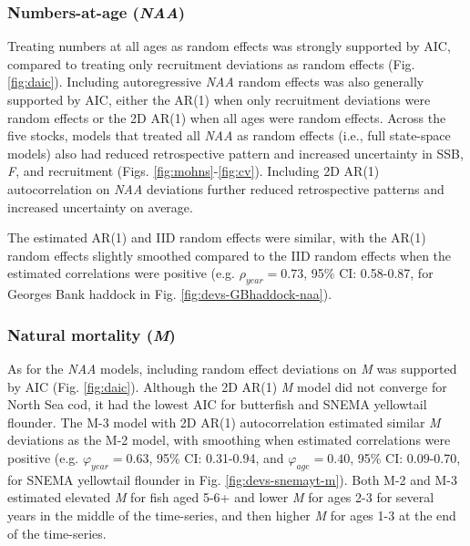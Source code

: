 \documentclass[]{article}
\begin{document}
\hypertarget{numbers-at-age-naa-1}{%
\subsubsection{\texorpdfstring{Numbers-at-age
(\emph{NAA})}{Numbers-at-age (NAA)}}\label{numbers-at-age-naa-1}}

Treating numbers at all ages as random effects was strongly supported by
AIC, compared to treating only recruitment deviations as random effects
(Fig. \ref{fig:daic}). Including autoregressive \emph{NAA} random
effects was also generally supported by AIC, either the AR(1) when only
recruitment deviations were random effects or the 2D AR(1) when all ages
were random effects. Across the five stocks, models that treated all
\emph{NAA} as random effects (i.e., full state-space models) also had
reduced retrospective pattern and increased uncertainty in SSB,
\emph{F}, and recruitment (Figs. \ref{fig:mohns}-\ref{fig:cv}).
Including 2D AR(1) autocorrelation on \emph{NAA} deviations further
reduced retrospective patterns and increased uncertainty on average.

The estimated AR(1) and IID random effects were similar, with the AR(1)
random effects slightly smoothed compared to the IID random effects when
the estimated correlations were positive (e.g. \(\rho_{year} = 0.73\),
95\% CI: 0.58-0.87, for Georges Bank haddock in Fig.
\ref{fig:devs-GBhaddock-naa}).

\hypertarget{natural-mortality-m-1}{%
\subsubsection{\texorpdfstring{Natural mortality
(\emph{M})}{Natural mortality (M)}}\label{natural-mortality-m-1}}

As for the \emph{NAA} models, including random effect deviations on
\emph{M} was supported by AIC (Fig. \ref{fig:daic}). Although the 2D
AR(1) \emph{M} model did not converge for North Sea cod, it had the
lowest AIC for butterfish and SNEMA yellowtail flounder. The M-3 model
with 2D AR(1) autocorrelation estimated similar \emph{M} deviations as
the M-2 model, with smoothing when estimated correlations were positive
(e.g. \(\varphi_{year} = 0.63\), 95\% CI: 0.31-0.94, and
\(\varphi_{age} = 0.40\), 95\% CI: 0.09-0.70, for SNEMA yellowtail
flounder in Fig. \ref{fig:devs-snemayt-m}). Both M-2 and M-3 estimated
elevated \emph{M} for fish aged 5-6+ and lower \emph{M} for ages 2-3 for
several years in the middle of the time-series, and then higher \emph{M}
for ages 1-3 at the end of the time-series.
\end{document}
